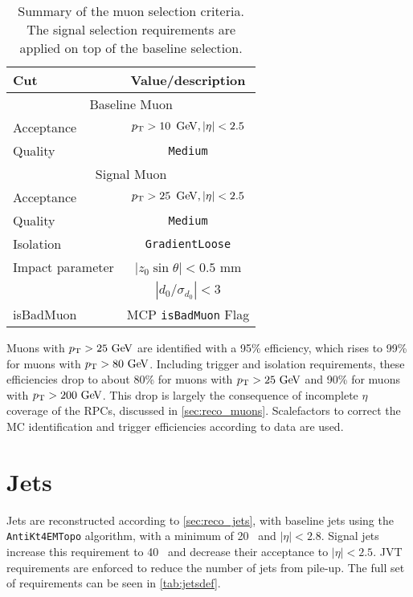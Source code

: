 \begin{table}[ph!]
  \begin{center}
    \begin{tabular}{l|c}
      \hline
      Cut            & Value/description \\
      \hline
      \hline
      \multicolumn{2}{c}{Baseline Muon}\\
      \hline
      Acceptance     & $\pt > 10\,\GeV, |\eta| < 2.5$ \\
      Quality        & \texttt{Medium}    \\
      \hline
      \multicolumn{2}{c}{Signal Muon}\\
      \hline
      Acceptance     & $\pt > 25\,\GeV, |\eta| < 2.5$ \\
      Quality        & \texttt{Medium}    \\
      Isolation        & \texttt{GradientLoose} \\
      Impact parameter & $|z_0 \sin\theta|< 0.5$ mm \\
                       & $|d_0/\sigma_{d_0}|< 3$ \\ 
      isBadMuon        & MCP \texttt{isBadMuon} Flag  \\
      \hline		  
      \hline
    \end{tabular}
  \caption{Summary of the muon selection criteria. The signal selection requirements are applied on top of the baseline selection.}            
    \label{tab:muondef}
  \end{center}
\end{table}

Muons with $\pt>25\gev$ are identified with a 95\% efficiency, which rises to 99\% for muons with $\pt>80\gev$\cite{PERF-2015-10}. Including trigger and isolation requirements, these efficiencies drop to about 80\% for muons with $\pt>25\gev$ and 90\% for muons with $\pt>200\gev$. This drop is largely the consequence of incomplete $\eta$ coverage of the \acp{RPC}, discussed in \autoref{sec:reco_muons}. Scalefactors to correct the \ac{MC} identification and trigger efficiencies according to data are used.

\section{Jets}

Jets are reconstructed according to \autoref{sec:reco_jets}, with baseline jets using the \texttt{AntiKt4EMTopo} algorithm, with a minimum \pt of 20\gev~ and $|\eta|<2.8$. Signal jets increase this \pt requirement to 40\gev~ and decrease their acceptance to $|\eta|<2.5$. \ac{JVT} requirements are enforced to reduce the number of jets from pile-up. The full set of requirements can be seen in \autoref{tab:jetsdef}.

